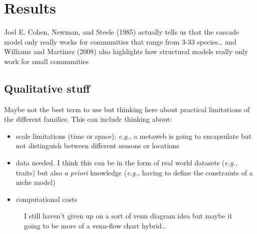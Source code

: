 \documentclass[
  letterpaper,
  DIV=11,
  numbers=noendperiod]{scrartcl}
\providecommand{\tightlist}{%
  \setlength{\itemsep}{0pt}\setlength{\parskip}{0pt}}\usepackage{longtable,booktabs,array}
\begin{document}
\section{Results}\label{results}

Joel E. Cohen, Newman, and Steele (1985) actually tells us that the
cascade model only really works for communities that range from 3-33
species\ldots{} and Williams and Martinez (2008) also highlights how
structural models really only work for small communities

\subsection{Qualitative stuff}\label{qualitative-stuff}

Maybe not the best term to use but thinking here about practical
limitations of the different families. This can include thinking about:

\begin{itemize}
\tightlist
\item
  scale limitations (time or space); \emph{e.g.,} a metaweb is going to
  encapsulate but not distinguish between different seasons or locations
\item
  data needed. I think this can be in the form of real world datasets
  (\emph{e.g.,} traits) but also \emph{a priori} knowledge (\emph{e.g.,}
  having to define the constraints of a niche model)
\item
  computational costs
\end{itemize}

\begin{figure}


\caption{\label{fig-venn}I still haven't given up on a sort of venn
diagram idea but maybe it going to be more of a venn-flow chart
hybrid\ldots{}}

\end{figure}%
\end{document}

